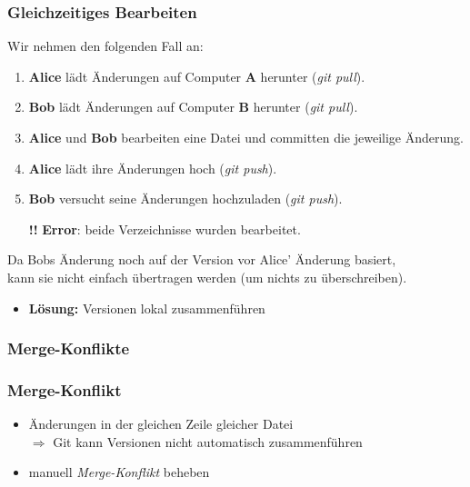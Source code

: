 \documentclass[accentcolor=tud8b,colorbacktitle,inverttitle,landscape,german,presentation,t]{tudbeamer}
\begin{document}
			\begin{frame}
				\frametitle{Gleichzeitiges Bearbeiten}
				Wir nehmen den folgenden Fall an:
				\begin{enumerate}
					\item \textbf{Alice} lädt Änderungen auf Computer \textbf{A} herunter (\textit{git pull}).
					\pause
					\item \textbf{Bob} lädt Änderungen auf Computer \textbf{B} herunter (\textit{git pull}).
					\pause
					\item \textbf{Alice} und \textbf{Bob} bearbeiten eine Datei und committen die jeweilige Änderung.
					\pause
					\item \textbf{Alice} lädt ihre Änderungen hoch (\textit{git push}).
					\pause
					\item \textbf{Bob} versucht seine Änderungen hochzuladen (\textit{git push}).
					\pause
					\item [\textbf{!!}] \textbf{Error}: beide Verzeichnisse wurden bearbeitet.
				\end{enumerate}
				
				Da Bobs Änderung noch auf der Version vor Alice' Änderung basiert,\\
				kann sie nicht einfach übertragen werden (um nichts zu überschreiben).\\
				\begin{itemize}
					\item \textbf{Lösung:} Versionen lokal zusammenführen
				\end{itemize}
			\end{frame}
			
		\subsubsection{Merge-Konflikte}
			\begin{frame}
				\frametitle{Merge-Konflikt}
					\begin{itemize}
						\item Änderungen in der gleichen Zeile gleicher Datei\\
						$\Rightarrow$ Git kann Versionen nicht automatisch zusammenführen
						\item manuell \textit{Merge-Konflikt} beheben
					\end{itemize}
			\end{frame}
			
\end{document}
